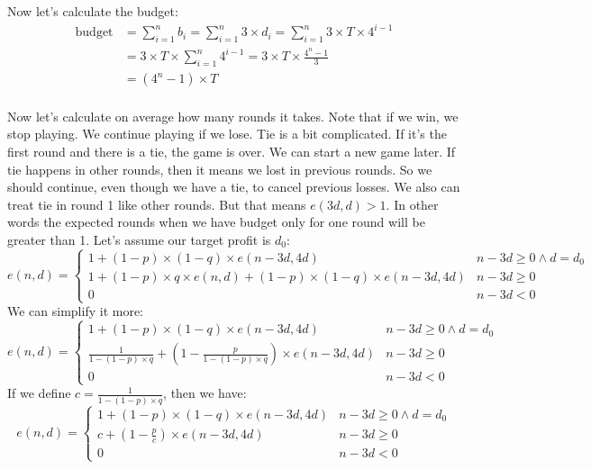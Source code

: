 \documentclass{book}
\begin{document}
	Now let's calculate the budget:
	\begin{equation*}
		\begin{split}
			\text{budget} &= \sum_{i = 1}^{n}{b_i} = \sum_{i = 1}^{n}{3 \times d_i} = \sum_{i = 1}^{n}{3 \times T \times 4^{i - 1}} \\
			&= 3 \times T \times \sum_{i = 1}^{n}{4^{i - 1}} = 3 \times T \times \frac{4^n - 1}{3} \\
			&= (4^n - 1) \times T
		\end{split}
	\end{equation*} \\
	Now let's calculate on average how many rounds it takes. Note that if we win, we stop playing. We continue playing if we lose. Tie is a bit complicated. If it's the first round and there is a tie, the game is over. We can start a new game later. If tie happens in other rounds, then it means we lost in previous rounds. So we should continue, even though we have a tie, to cancel previous losses. We also can treat tie in round 1 like other rounds. But that means $e(3d, d) > 1$. In other words the expected rounds when we have budget only for one round will be greater than 1. Let's assume our target profit is $d_0$:
	\begin{equation*}
		e(n, d) = \begin{cases}
			1 + (1 - p) \times (1 - q) \times e(n - 3d, 4d) & n - 3d \ge 0 \land d = d_0 \\
			1 + (1 - p) \times q \times e(n, d) + (1 - p) \times (1 - q) \times e(n - 3d, 4d) & n - 3d \ge 0 \\
			0 & n - 3d < 0
		\end{cases}
	\end{equation*}
	We can simplify it more:
	\begin{equation*}
		e(n, d) = \begin{cases}
			1 + (1 - p) \times (1 - q) \times e(n - 3d, 4d) & n - 3d \ge 0 \land d = d_0 \\			
			\frac{1}{1 - (1 - p) \times q} + (1 - \frac{p}{1 - (1 - p) \times q}) \times e(n - 3d, 4d) & n - 3d \ge 0 \\
			0 & n - 3d < 0
		\end{cases}
	\end{equation*}	
	If we define $c = \frac{1}{1 - (1 - p) \times q}$, then we have:
	\begin{equation*}
	e(n, d) = \begin{cases}
		1 + (1 - p) \times (1 - q) \times e(n - 3d, 4d) & n - 3d \ge 0 \land d = d_0 \\		
		c + (1 - \frac{p}{c}) \times e(n - 3d, 4d) & n - 3d \ge 0 \\
		0 & n - 3d < 0
	\end{cases}
	\end{equation*}	
\end{document}
